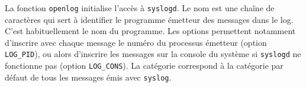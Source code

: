 \documentclass [twoside] {report}
\begin{document}
% 
% 
% 

La fonction {\tt openlog} initialise l'accès à {\tt syslogd}. Le nom est
une chaîne de caractères qui sert à identifier le programme émetteur des
messages dans le log. C'est habituellement le nom du programme. Les
options permettent notamment d'inscrire avec chaque message le numéro du
processus émetteur (option {\tt LOG\_PID}), ou alors d'inscrire les
messages sur la console du système si {\tt syslogd} ne fonctionne pas
(option {\tt LOG\_CONS}). La catégorie correspond à la catégorie par
défaut de tous les messages émis avec {\tt syslog}.
\end{document}
